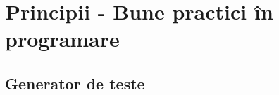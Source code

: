 \documentclass[../main.tex]{subfiles}
\begin{document}
\chapter{Principii - Bune practici în programare}

\section{Generator de teste}
\label{code:principles-generator}

\inputminted{cpp}{../src/principles/gen.cpp}
\end{document}

